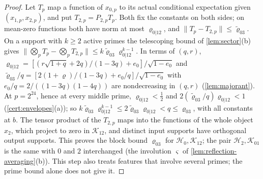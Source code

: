 \begin{proof}
Let $T_p$ map a function of $x_{0,p}$ to its actual conditional expectation
given $(x_{1,p},x_{2,p})$, and put $T_{2,p}=P_{2,p}T_p$. Both fix the constants on
both sides; on mean-zero functions both have norm at most $\varrho_{0|12}$, and
$\|T_p-T_{2,p}\|\le\tilde\varrho_{03}$. On a support with $k\ge2$ active primes the
telescoping bound of \cref{lem:sector}(b) gives
$\|\bigotimes_pT_p-\bigotimes_pT_{2,p}\|\le k\tilde\varrho_{03}\varrho_{0|12}^{k-1}$. In
terms of $(q,r)$, $\varrho_{0|12}=[(r\sqrt{1+q}+2q)/(1-3q)+e_0]/\sqrt{1-e_0}$ and
$\tilde\varrho_{03}/q=[2(1+\varrho)/(1-3q)+e_0/q]/\sqrt{1-e_0}$ with
$e_0/q=2/((1-3q)(1-4q))$ are nondecreasing in $(q,r)$ (\cref{lem:majorant}). At
$p=2^{24}$, hence at every middle prime, $\varrho_{0|12}<\frac12$ and
$2(\tilde\varrho_{03}/q)\varrho_{0|12}<1$ (\cref{cert:envelopes}(a)); so
$k\tilde\varrho_{03}\varrho_{0|12}^{k-1}\le2\tilde\varrho_{03}\varrho_{0|12}<q\le\varrho_{03}$,
with all constants at $b$. The tensor product of the $T_{2,p}$ maps into the
functions of the whole object $x_2$, which project to zero in $\mathcal K_{12}$, and
distinct input supports have orthogonal output supports. This proves the block
bound $\varrho_{03}$ for $\mathcal H_0,\mathcal K_{12}$; the pair $\mathcal H_2,\mathcal K_{01}$ is
the same with $0$ and $2$ interchanged (the involution $\varsigma$ of
\cref{lem:reflection-averaging}(b)). This step also treats features that involve
several primes; the prime bound alone does not give it.


\end{proof}
